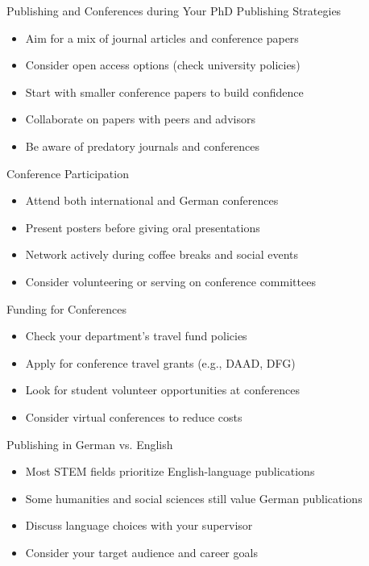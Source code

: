 \documentclass[aspectratio=169,10pt]{beamer}
\begin{document}
\begin{frame}{Publishing and Conferences during Your PhD}
\alert{Publishing Strategies}
\begin{itemize}
    \item Aim for a mix of journal articles and conference papers
    \item Consider open access options (check university policies)
    \item Start with smaller conference papers to build confidence
    \item Collaborate on papers with peers and advisors
    \item Be aware of predatory journals and conferences
\end{itemize}

\alert{Conference Participation}
\begin{itemize}
    \item Attend both international and German conferences
    \item Present posters before giving oral presentations
    \item Network actively during coffee breaks and social events
    \item Consider volunteering or serving on conference committees
\end{itemize}

\alert{Funding for Conferences}
\begin{itemize}
    \item Check your department's travel fund policies
    \item Apply for conference travel grants (e.g., DAAD, DFG)
    \item Look for student volunteer opportunities at conferences
    \item Consider virtual conferences to reduce costs
\end{itemize}

\alert{Publishing in German vs. English}
\begin{itemize}
    \item Most STEM fields prioritize English-language publications
    \item Some humanities and social sciences still value German publications
    \item Discuss language choices with your supervisor
    \item Consider your target audience and career goals
\end{itemize}
\end{frame}
\end{document}
